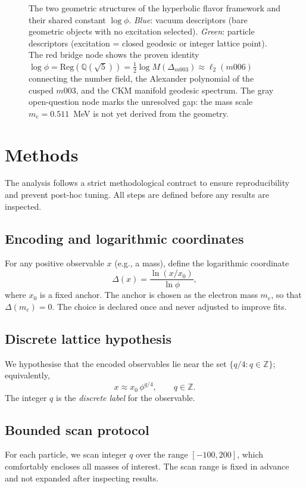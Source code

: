 \documentclass[12pt]{article}
\theoremstyle{definition}
\begin{document}
\begin{figure}[htbp]
\centering

\caption{The two geometric structures of the hyperbolic flavor framework
and their shared constant $\log\phi$. \textit{Blue}: vacuum descriptors
(bare geometric objects with no excitation selected).
\textit{Green}: particle descriptors (excitation = closed geodesic or
integer lattice point). The red bridge node shows the proven identity
$\log\phi = \mathrm{Reg}(\mathbb{Q}(\sqrt5)) = \tfrac{1}{2}\log
M(\Delta_{m003}) \approx \ell_2(m006)$ connecting the number field,
the Alexander polynomial of the cusped $m003$, and the CKM manifold
geodesic spectrum. The gray open-question node marks the unresolved
gap: the mass scale $m_e = 0.511$~MeV is not yet derived from the
geometry.}
\label{fig:two_structures}
\end{figure}

\section{Methods}
\label{sec:methods}

The analysis follows a strict methodological contract to ensure reproducibility and prevent post-hoc tuning. All steps are defined before any results are inspected.

\subsection{Encoding and logarithmic coordinates}
For any positive observable $x$ (e.g., a mass), define the logarithmic coordinate
\[
\Delta(x) = \frac{\ln(x/x_0)}{\ln\phi},
\]
where $x_0$ is a fixed anchor. The anchor is chosen as the electron mass $m_e$, so that $\Delta(m_e)=0$. The choice is declared once and never adjusted to improve fits.

\subsection{Discrete lattice hypothesis}
We hypothesise that the encoded observables lie near the set $\{q/4 : q\in\mathbb{Z}\}$; equivalently,
\[
x \approx x_0 \,\phi^{q/4},\qquad q\in\mathbb{Z}.
\]
The integer $q$ is the \emph{discrete label} for the observable.

\subsection{Bounded scan protocol}
For each particle, we scan integer $q$ over the range $[-100,200]$, which comfortably encloses all masses of interest. The scan range is fixed in advance and not expanded after inspecting results.
\end{document}
